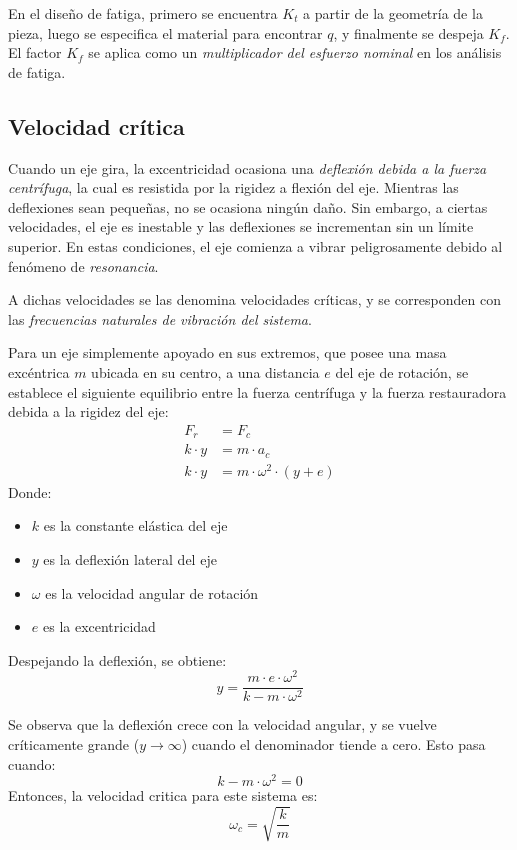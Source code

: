 \documentclass[spanish,11pt,a4paper]{article}
\begin{document}
	En el diseño de fatiga, primero se encuentra $K_t$ a partir de la geometría de la pieza, luego se especifica el material para encontrar $q$, y finalmente se despeja $K_f$. El factor $K_f$ se aplica como un \emph{multiplicador del esfuerzo nominal} en los análisis de fatiga.
	
	\subsection{Velocidad crítica}
	Cuando un eje gira, la excentricidad ocasiona una \emph{deflexión debida a la fuerza centrífuga}, la cual es resistida por la rigidez a flexión del eje. Mientras las deflexiones sean pequeñas, no se ocasiona ningún daño. Sin embargo, a ciertas velocidades, el eje es inestable y las deflexiones se incrementan sin un límite superior. En estas condiciones, el eje comienza a vibrar peligrosamente debido al fenómeno de \emph{resonancia}. 
	
	A dichas velocidades se las denomina velocidades críticas, y se corresponden con las \emph{frecuencias naturales de vibración del sistema}.
	
	
	Para un eje simplemente apoyado en sus extremos, que posee una masa excéntrica $m$ ubicada en su centro, a una distancia $e$ del eje de rotación, se establece el siguiente equilibrio entre la fuerza centrífuga y la fuerza restauradora debida a la rigidez del eje:
	\begin{equation*}
		\begin{aligned}
			F_r &= F_c\\
		k\cdot y &= m \cdot a_c \\
		k\cdot y &= m \cdot \omega^2 \cdot (y+e)
		\end{aligned}
	\end{equation*}
	Donde:
	\begin{itemize}
		\item $k$ es la constante elástica del eje
		\item $y$ es la deflexión lateral del eje
		\item $\omega$ es la velocidad angular de rotación
		\item $e$ es la excentricidad
	\end{itemize}
	
	Despejando la deflexión, se obtiene:
	\begin{equation*}
		y = \dfrac{m \cdot e \cdot \omega^2}{k-m\cdot \omega^2}
	\end{equation*}
	
	Se observa que la deflexión crece con la velocidad angular, y se vuelve críticamente grande ($y\rightarrow \infty$) cuando el denominador tiende a cero. Esto pasa cuando:
	\begin{equation*}
		k-m\cdot \omega^2 = 0
	\end{equation*}
	 Entonces, la velocidad critica para este sistema es:
	 \begin{equation*}
	 	\omega_c = \sqrt{\dfrac{k}{m}}
	 \end{equation*}
	
\end{document}
